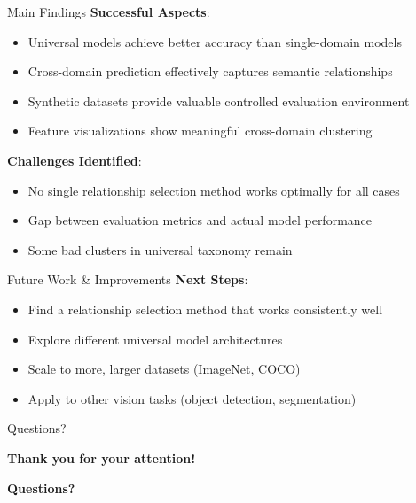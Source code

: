 \documentclass[aspectratio=169]{beamer}
\begin{document}
\begin{frame}{Main Findings}
    \textbf{Successful Aspects}:
    \begin{itemize}
        \item Universal models achieve better accuracy than single-domain models
        \item Cross-domain prediction effectively captures semantic relationships
        \item Synthetic datasets provide valuable controlled evaluation environment
        \item Feature visualizations show meaningful cross-domain clustering
    \end{itemize}

    \vspace{1em}

    \textbf{Challenges Identified}:
    \begin{itemize}
        \item No single relationship selection method works optimally for all cases
        \item Gap between evaluation metrics and actual model performance
        \item Some bad clusters in universal taxonomy remain
    \end{itemize}
\end{frame}

\begin{frame}{Future Work \& Improvements}
    \textbf{Next Steps}:
    \vspace{0.5em}
    \begin{itemize}
        \item Find a relationship selection method that works consistently well
        \item Explore different universal model architectures
        \item Scale to more, larger datasets (ImageNet, COCO)
        \item Apply to other vision tasks (object detection, segmentation)
    \end{itemize}
\end{frame}

\begin{frame}{Questions?}
    \begin{center}
        \textbf{\Large Thank you for your attention!}

        \vspace{1em}

        \textbf{Questions?}
    \end{center}
\end{frame}
\end{document}
